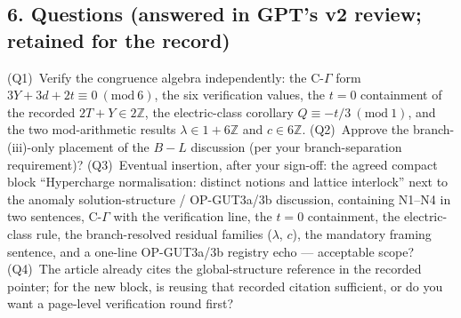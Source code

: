 \subsection*{6. Questions (answered in GPT's v2 review; retained
for the record)}
(Q1)~Verify the congruence algebra independently: the C-$\Gamma$
form $3Y+3d+2t\equiv0\ (\mathrm{mod}\ 6)$, the six verification
values, the $t=0$ containment of the recorded $2T+Y\in2\mathbb Z$,
the electric-class corollary $Q\equiv-t/3\ (\mathrm{mod}\ 1)$,
and the two mod-arithmetic results $\lambda\in1+6\mathbb Z$ and
$c\in6\mathbb Z$.
(Q2)~Approve the branch-(iii)-only placement of the $B{-}L$
discussion (per your branch-separation requirement)?
(Q3)~Eventual insertion, after your sign-off: the agreed compact
block ``Hypercharge normalisation: distinct notions and lattice
interlock'' next to the anomaly solution-structure /
OP-GUT3a/3b discussion, containing N1--N4 in two sentences,
C-$\Gamma$ with the verification line, the $t=0$ containment,
the electric-class rule, the branch-resolved residual families
($\lambda$, $c$), the mandatory framing sentence, and a one-line
OP-GUT3a/3b registry echo --- acceptable scope?
(Q4)~The article already cites the global-structure reference in
the recorded pointer; for the new block, is reusing that recorded
citation sufficient, or do you want a page-level verification
round first?
